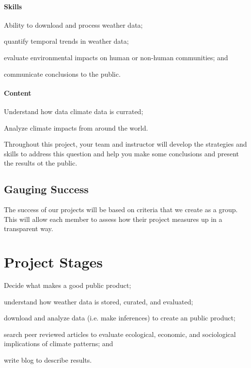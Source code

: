 \documentclass{article}\usepackage[]{graphicx}\usepackage[]{color}
\newenvironment{itemize*}%
  {\begin{itemize}%
    \setlength{\itemsep}{0pt}%
    \setlength{\parskip}{0pt}}%
  {\end{itemize}}
\newenvironment{enumerate*}%
  {\begin{enumerate}%
    \setlength{\itemsep}{0pt}%
    \setlength{\parskip}{0pt}}%
  {\end{enumerate}}
\begin{document}
\paragraph{Skills}

\begin{itemize*}
  \item Ability to download and process weather data;
  \item quantify temporal trends in weather data;
  \item evaluate environmental impacts on human or non-human communities; and
  \item communicate conclusions to the public.
\end{itemize*}

\paragraph{Content}
\begin{itemize*}
  \item Understand how data climate data is currated;
  \item Analyze climate impacts from around the world.
\end{itemize*}

Throughout this project, your team and instructor will develop the strategies and skills to address this question and help you make some conclusions and present the results ot the public.

\subsection{Gauging Success}

The success of our projects will be based on criteria that we create as a group. This will allow each member to assess how their project measures up in a transparent way.
\section{Project Stages}

\begin{enumerate*}
  \item Decide what makes a good public product;
  \item understand how weather data is stored, curated, and evaluated; 
  \item download and analyze data (i.e. make inferences) to create an public product;
  \item search peer reviewed articles to evaluate ecological, economic, and sociological implications of climate patterns; and
  \item write blog to describe results. 
\end{enumerate*}
\end{document}
